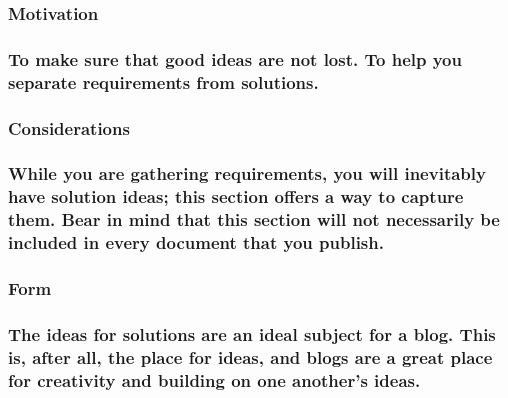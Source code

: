 \documentclass[
]{article}
\begin{document}
\hypertarget{motivation-76}{%
\subsubsection{Motivation}\label{motivation-76}}

\hypertarget{to-make-sure-that-good-ideas-are-not-lost.-to-help-you-separate-requirements-from-solutions.}{%
\subsubsection{To make sure that good ideas are not lost. To help you
separate requirements from
solutions.}\label{to-make-sure-that-good-ideas-are-not-lost.-to-help-you-separate-requirements-from-solutions.}}

\hypertarget{considerations-58}{%
\subsubsection{Considerations}\label{considerations-58}}

\hypertarget{while-you-are-gathering-requirements-you-will-inevitably-have-solution-ideas-this-section-offers-a-way-to-capture-them.-bear-in-mind-that-this-section-will-not-necessarily-be-included-in-every-document-that-you-publish.}{%
\subsubsection{While you are gathering requirements, you will inevitably
have solution ideas; this section offers a way to capture them. Bear in
mind that this section will not necessarily be included in every
document that you
publish.}\label{while-you-are-gathering-requirements-you-will-inevitably-have-solution-ideas-this-section-offers-a-way-to-capture-them.-bear-in-mind-that-this-section-will-not-necessarily-be-included-in-every-document-that-you-publish.}}

\hypertarget{form-38}{%
\subsubsection{Form}\label{form-38}}

\hypertarget{the-ideas-for-solutions-are-an-ideal-subject-for-a-blog.-this-is-after-all-the-place-for-ideas-and-blogs-are-a-great-place-for-creativity-and-building-on-one-anothers-ideas.}{%
\subsubsection{The ideas for solutions are an ideal subject for a blog.
This is, after all, the place for ideas, and blogs are a great place for
creativity and building on one another's
ideas.}\label{the-ideas-for-solutions-are-an-ideal-subject-for-a-blog.-this-is-after-all-the-place-for-ideas-and-blogs-are-a-great-place-for-creativity-and-building-on-one-anothers-ideas.}}

\hypertarget{section-39}{%
\subsubsection{}\label{section-39}}
\end{document}
